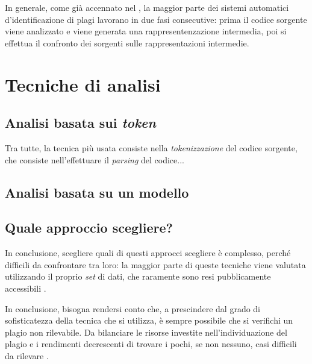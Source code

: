 

In generale, come già accennato nel , la maggior parte dei sistemi automatici d'identificazione di plagi lavorano in due fasi consecutive: prima il codice sorgente viene analizzato e viene generata una rappresentenzazione intermedia, poi si effettua il confronto dei sorgenti sulle rappresentazioni intermedie.

\section{Tecniche di analisi}

\subsection{Analisi basata sui \textit{token}}
Tra tutte, la tecnica più usata consiste nella \textit{tokenizzazione} del codice sorgente, che consiste nell'effettuare il \textit{parsing} del codice...

\subsection{Analisi basata su un modello}

\subsection{Quale approccio scegliere?}
In conclusione, scegliere quali di questi approcci scegliere è complesso, perché difficili da confrontare tra loro: la maggior parte di queste tecniche viene valutata utilizzando il proprio \textit{set} di dati, che raramente sono resi pubblicamente accessibili \cite{karnalim-budi-toba-joy-2019}.

In conclusione, bisogna rendersi conto che, a prescindere dal grado di sofisticatezza della tecnica che si utilizza, è sempre possibile che si verifichi un plagio non rilevabile.
%
Da bilanciare le risorse investite nell'individuazione del plagio e i rendimenti decrescenti di trovare i pochi, se non nessuno, casi difficili da rilevare \cite{joy-99}.


